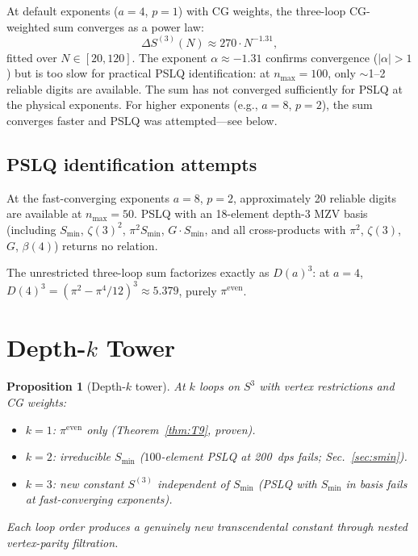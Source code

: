 \documentclass[11pt]{article}
\newtheorem{proposition}{Proposition}
\begin{document}
At default exponents ($a = 4$, $p = 1$) with CG weights, the
three-loop CG-weighted sum converges as a power law:
\begin{equation}
  \Delta S^{(3)}(N) \approx 270 \cdot N^{-1.31},
  \label{eq:convergence_rate}
\end{equation}
fitted over $N \in [20, 120]$.  The exponent $\alpha \approx -1.31$
confirms convergence ($|\alpha| > 1$) but is too slow for practical
PSLQ identification: at $n_{\max} = 100$, only $\sim$1--2 reliable
digits are available.  The sum has not converged sufficiently for PSLQ
at the physical exponents.  For higher exponents (e.g., $a = 8$,
$p = 2$), the sum converges faster and PSLQ was attempted---see below.

\subsection{PSLQ identification attempts}

At the fast-converging exponents $a = 8$, $p = 2$, approximately 20
reliable digits are available at $n_{\max} = 50$.  PSLQ with an
18-element depth-3 MZV basis (including $S_{\min}$, $\zeta(3)^2$,
$\pi^2 S_{\min}$, $G \cdot S_{\min}$, and all cross-products with
$\pi^2$, $\zeta(3)$, $G$, $\beta(4)$) returns no relation.

The unrestricted three-loop sum factorizes exactly as $D(a)^3$: at
$a = 4$, $D(4)^3 = (\pi^2 - \pi^4/12)^3 \approx 5.379$, purely
$\pi^{\mathrm{even}}$.

\section{Depth-$k$ Tower}
\label{sec:depth_k}

\begin{proposition}[Depth-$k$ tower]
\label{prop:depth_k}
At $k$ loops on $S^3$ with vertex restrictions and CG weights:
\begin{itemize}
\item $k = 1$: $\pi^{\mathrm{even}}$ only
      (Theorem~\ref{thm:T9}, proven).
\item $k = 2$: irreducible $S_{\min}$
      ($100$-element PSLQ at 200~dps fails;
      Sec.~\ref{sec:smin}).
\item $k = 3$: new constant $S^{(3)}$ independent of $S_{\min}$
      (PSLQ with $S_{\min}$ in basis fails at
      fast-converging exponents).
\end{itemize}
Each loop order produces a genuinely new transcendental constant through
nested vertex-parity filtration.
\end{proposition}
\end{document}
